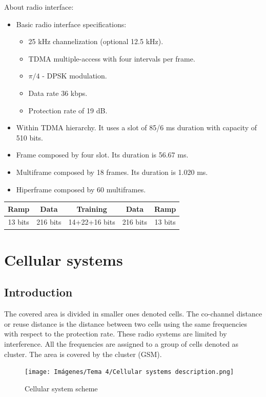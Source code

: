 \documentclass[
	12pt,
	twoside
]{book}
\begin{document}
About radio interface:

\begin{itemize}
	\item {
		Basic radio interface specifications:
		\begin{itemize}
			\item 25 kHz channelization (optional 12.5 kHz).
			\item TDMA multiple-access with four intervals per frame.
			\item $\pi/4$ - DPSK modulation.
			\item Data rate 36 kbps.
			\item Protection rate of 19 dB.
		\end{itemize}
	}
	\item Within TDMA hierarchy. It uses a slot of 85/6 ms duration with capacity of 510 bits.
	\item Frame composed by four slot. Its duration is 56.67 ms.
	\item Multiframe composed by 18 frames. Its duration is 1.020 ms.
	\item Hiperframe composed by 60 multiframes.
\end{itemize}

\begin{tabular}{|c|c|c|c|c|}
	\hline
	Ramp	& Data		& Training		& Data		& Ramp \\
	\hline
	13 bits	& 216 bits	& 14+22+16 bits	& 216 bits	& 13 bits \\
	\hline
\end{tabular}

\section{Cellular systems}

\subsection{Introduction}

The covered area is divided in smaller ones denoted cells. The co-channel distance or reuse distance is the distance between two cells using the same frequencies with respect to the protection rate. These radio systems are limited by interference. All the frequencies are assigned to a group of cells denoted as cluster. The area is covered by the cluster (GSM).

\begin{figure}[H]
	\centering
	\texttt{[image: Imágenes/Tema 4/Cellular systems description.png]}
	\caption{
		\label{fig:unit4_cells_scheme}
		Cellular system scheme
	}
\end{figure}
\end{document}
